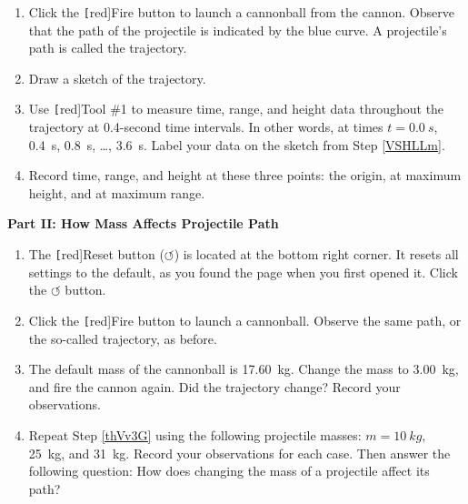 \documentclass[dvipsnames]{article}
\begin{document}
\begin{enumerate}
    \item Click the \texttt[red]{Fire} button to launch a cannonball from the cannon. Observe that the path of the projectile is indicated by the blue curve. A projectile's path is called the trajectory.
    \item Draw a sketch of the trajectory. 
    \item \label{VSHLLm} Use \texttt[red]{Tool \#1} to measure time, range, and height data throughout the trajectory at 0.4-second time intervals. In other words, at times $t=\SI{0.0}{s}$, \SI{0.4}{s}, \SI{0.8}{s}, \ldots, \SI{3.6}{s}. Label your data on the sketch from Step \ref{VSHLLm}.
    \item Record time, range, and height at these three points: the origin, at maximum height, and at maximum range.
\end{enumerate}



\vspace{1em}

\textbf{Part II: How Mass Affects Projectile Path}

\begin{enumerate}
    \item The \texttt[red]{Reset} button ($\boldsymbol{\circlearrowleft}$) is located at the bottom right corner. It resets all settings to the default, as you found the page when you first opened it. Click the $\boldsymbol{\circlearrowleft}$ button.
    \item Click the \texttt[red]{Fire} button to launch a cannonball. Observe the same path, or the so-called trajectory, as before.
    \item \label{thVv3G} The default mass of the cannonball is \SI{17.60}{kg}. Change the mass to \SI{3.00}{kg}, and fire the cannon again. Did the trajectory change? Record your observations. 
    \item Repeat Step \ref{thVv3G} using the following projectile masses: $m=\SI{10}{kg}$, \SI{25}{kg}, and \SI{31}{kg}. Record your observations for each case. Then answer the following question: How does changing the mass of a projectile affect its path?
\end{enumerate}

\vspace{1em}
\end{document}

